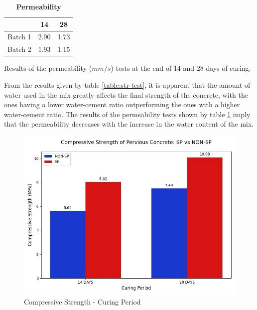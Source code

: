 \documentclass{ieeeaccess}
\begin{document}
\begin{table}[!htb]
    \begin{threeparttable}
        \caption{\textbf{Permeability}}
        \label{table:perm-test}
        \setlength{\tabcolsep}{16.5pt}
        \def\arraystretch{1.5}%
        \begin{tabular}{ l r r }
            \hline
            & \multicolumn{1}{c}{14} & \multicolumn{1}{c}{28} \\
            \hline

            Batch 1 & 2.90 & 1.73 \\ 
            Batch 2 & 1.93 & 1.15 \\

            \hline
        \end{tabular} 
        \begin{tablenotes}
            \item Results of the permeability ($mm/s$) tests at the end of 
            14 and 28 days of curing.
        \end{tablenotes}
    \end{threeparttable}
\end{table}

From the results given by table \ref{table:str-test}, it is apparent that the 
amount of water used in the mix greatly affects the final strength of the 
concrete, with the ones having a lower water-cement ratio outperforming the ones 
with a higher water-cement ratio.
The results of the permeability tests shown by table \ref{table:perm-test} imply
that the permeability decreases with the increase in the water content of the 
mix. 

\begin{figure}[h]
    \caption{Compressive Strength - Curing Period}
    \centering
    \includegraphics[scale=0.25]{comp-graph}
\end{figure}
\end{document}
